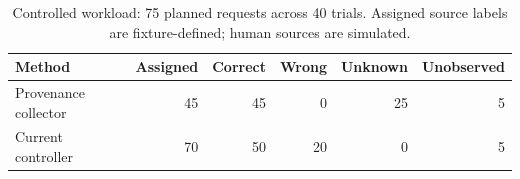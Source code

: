 \begin{table}[tb]
\centering\small
\begin{tabular}{@{}lrrrrr@{}}
\toprule
Method & Assigned & Correct & Wrong & Unknown & Unobserved \\
\midrule
Provenance collector & 45 & 45 & 0 & 25 & 5 \\
Current controller & 70 & 50 & 20 & 0 & 5 \\
\bottomrule
\end{tabular}
\caption{Controlled workload: 75 planned requests across 40 trials. Assigned source labels are fixture-defined; human sources are simulated.}
\label{tab:attribution}
\end{table}
